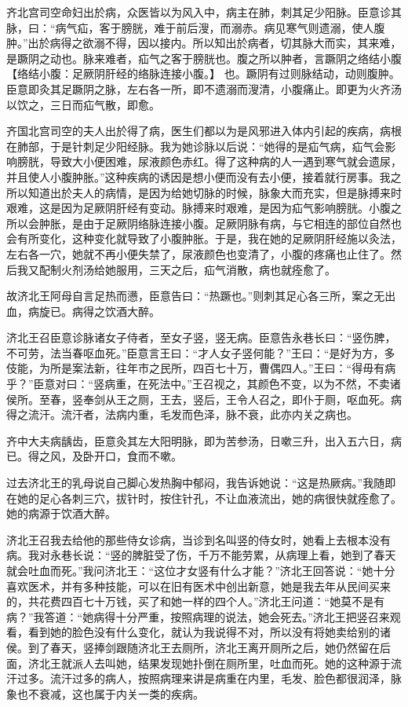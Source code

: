 \documentclass[12pt,UTF8]{ctexbook}
\begin{document}
齐北宫司空命妇出於病，众医皆以为风入中，病主在肺，刺其足少阳脉。臣意诊其脉，曰：“病气疝，客于膀胱，难于前后溲，而溺赤。病见寒气则遗溺，使人腹肿。”出於病得之欲溺不得，因以接内。所以知出於病者，切其脉大而实，其来难，是蹶阴之动也。脉来难者，疝气之客于膀胱也。腹之所以肿者，言蹶阴之络结小腹【络结小腹：足厥阴肝经的络脉连接小腹。】 也。蹶阴有过则脉结动，动则腹肿。臣意即灸其足蹶阴之脉，左右各一所，即不遗溺而溲清，小腹痛止。即更为火齐汤以饮之，三日而疝气散，即愈。

齐国北宫司空的夫人出於得了病，医生们都以为是风邪进入体内引起的疾病，病根在肺部，于是针刺足少阳经脉。我为她诊脉以后说：“她得的是疝气病，疝气会影响膀胱，导致大小便困难，尿液颜色赤红。得了这种病的人一遇到寒气就会遗尿，并且使人小腹肿胀。”这种疾病的诱因是想小便而没有去小便，接着就行房事。我之所以知道出於夫人的病情，是因为给她切脉的时候，脉象大而充实，但是脉搏来时艰难，这是因为足厥阴肝经有变动。脉搏来时艰难，是因为疝气影响膀胱。小腹之所以会肿胀，是由于足厥阴络脉连接小腹。足厥阴脉有病，与它相连的部位自然也会有所变化，这种变化就导致了小腹肿胀。于是，我在她的足厥阴肝经施以灸法，左右各一穴，她就不再小便失禁了，尿液颜色也变清了，小腹的疼痛也止住了。然后我又配制火剂汤给她服用，三天之后，疝气消散，病也就痊愈了。

故济北王阿母自言足热而懑，臣意告曰：“热蹶也。”则刺其足心各三所，案之无出血，病旋已。病得之饮酒大醉。

济北王召臣意诊脉诸女子侍者，至女子竖，竖无病。臣意告永巷长曰：“竖伤脾，不可劳，法当春呕血死。”臣意言王曰：“才人女子竖何能？”王曰：“是好为方，多伎能，为所是案法新，往年市之民所，四百七十万，曹偶四人。”王曰：“得毋有病乎？”臣意对曰：“竖病重，在死法中。”王召视之，其颜色不变，以为不然，不卖诸侯所。至春，竖奉剑从王之厕，王去，竖后，王令人召之，即仆于厕，呕血死。病得之流汗。流汗者，法病内重，毛发而色泽，脉不衰，此亦内关之病也。

齐中大夫病龋齿，臣意灸其左大阳明脉，即为苦参汤，日嗽三升，出入五六日，病已。得之风，及卧开口，食而不嗽。

过去济北王的乳母说自己脚心发热胸中郁闷，我告诉她说：“这是热厥病。”我随即在她的足心各刺三穴，拔针时，按住针孔，不让血液流出，她的病很快就痊愈了。她的病源于饮酒大醉。

济北王召我去给他的那些侍女诊病，当诊到名叫竖的侍女时，她看上去根本没有病。我对永巷长说：“竖的脾脏受了伤，千万不能劳累，从病理上看，她到了春天就会吐血而死。”我问济北王：“这位才女竖有什么才能？”济北王回答说：“她十分喜欢医术，并有多种技能，可以在旧有医术中创出新意，她是我去年从民间买来的，共花费四百七十万钱，买了和她一样的四个人。”济北王问道：“她莫不是有病？”我答道：“她病得十分严重，按照病理的说法，她会死去。”济北王把竖召来观看，看到她的脸色没有什么变化，就认为我说得不对，所以没有将她卖给别的诸侯。到了春天，竖捧剑跟随济北王去厕所，济北王离开厕所之后，她仍然留在后面，济北王就派人去叫她，结果发现她扑倒在厕所里，吐血而死。她的这种源于流汗过多。流汗过多的病人，按照病理来讲是病重在内里，毛发、脸色都很润泽，脉象也不衰减，这也属于内关一类的疾病。
\end{document}
